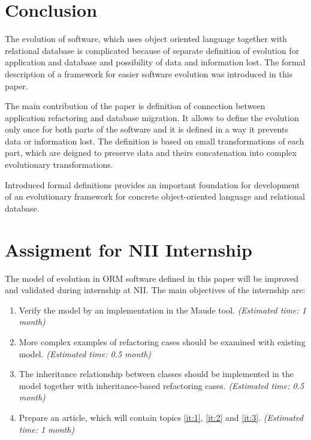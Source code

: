 \documentclass[11pt]{article}
\begin{document}
 
 
\section{Conclusion}
The evolution of software, which uses object oriented language together with relational database is complicated because of separate definition of evolution for application and database and possibility of data and information lost. The formal description of a framework for easier software evolution was introduced in this paper. 

The main contribution of the paper is definition of connection between application refactoring and database migration. It allows to define the evolution only once for both parts of the software and it is defined in a way it prevents data or information lost. The definition is based on small transformations of each part, which are deigned to preserve data and theirs concatenation into complex evolutionary transformations.

Introduced formal definitions provides an important foundation for development of an evolutionary framework for concrete object-oriented language and relational database.

\newpage
\appendix
\section{Assigment for NII Internship}
The model of evolution in ORM software defined in this paper will be improved and validated during internship at NII. The main objectives of the internship are:
\begin{enumerate}
	\item \label{it:1} Verify the model by an implementation in the Maude tool. \emph{(Estimated time: 1 month)}
	\item \label{it:2} More complex examples of refactoring cases should be examined with existing model.  \emph{(Estimated time: 0.5 month)}
	\item \label{it:3} The inheritance relationship between classes should be implemented in the model together with inheritance-based refactoring cases. \emph{(Estimated time: 0.5 month)}
	\item Prepare an article, which will contain topics \ref{it:1}, \ref{it:2} and \ref{it:3}. \emph{(Estimated time: 1 month)}
\end{enumerate}

\newpage
\end{document}
